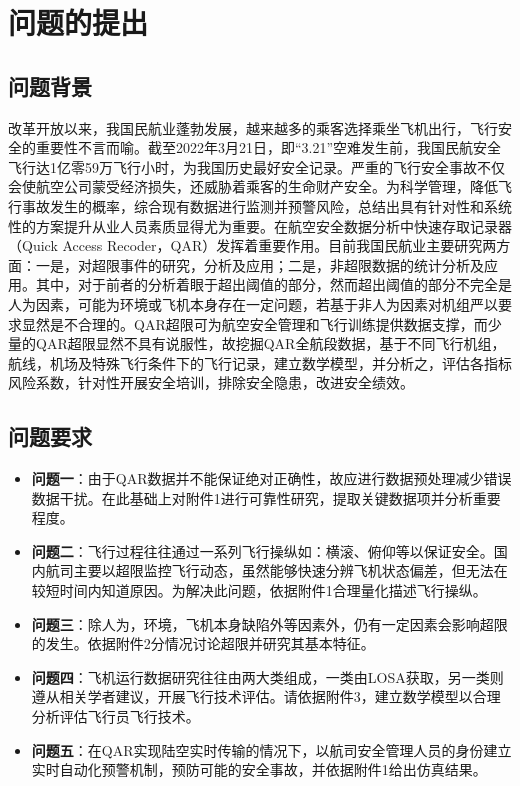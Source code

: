 \documentclass{MathorCupModeling}
\begin{document}
	\pagestyle{empty}
	\tableofcontents
	\newpage
	\pagestyle{fancy}

	\setcounter{page}{1}
	\section{问题的提出}
	\subsection{问题背景}
	改革开放以来，我国民航业蓬勃发展，越来越多的乘客选择乘坐飞机出行，飞行安全的重要性不言而喻。截至2022年3月21日，即“3.21”空难发生前，我国民航安全飞行达1亿零59万飞行小时，为我国历史最好安全记录。严重的飞行安全事故不仅会使航空公司蒙受经济损失，还威胁着乘客的生命财产安全。为科学管理，降低飞行事故发生的概率，综合现有数据进行监测并预警风险，总结出具有针对性和系统性的方案提升从业人员素质显得尤为重要。在航空安全数据分析中快速存取记录器（Quick Access Recoder，QAR）发挥着重要作用。目前我国民航业主要研究两方面：{\heiti 一是}，对超限事件的研究，分析及应用；{\heiti 二是}，非超限数据的统计分析及应用。其中，对于前者的分析着眼于超出阈值的部分，然而超出阈值的部分不完全是人为因素，可能为环境或飞机本身存在一定问题，若基于非人为因素对机组严以要求显然是不合理的。QAR超限可为航空安全管理和飞行训练提供数据支撑，而少量的QAR超限显然不具有说服性，故挖掘QAR全航段数据，基于不同飞行机组，航线，机场及特殊飞行条件下的飞行记录，建立数学模型，并分析之，评估各指标风险系数，针对性开展安全培训，排除安全隐患，改进安全绩效。
	\subsection{问题要求}
	\begin{itemize}
		\item \textbf{问题一}：由于QAR数据并不能保证绝对正确性，故应进行数据预处理减少错误数据干扰。在此基础上对附件1进行可靠性研究，提取关键数据项并分析重要程度。
		\item \textbf{问题二}：飞行过程往往通过一系列飞行操纵如：横滚、俯仰等以保证安全。国内航司主要以超限监控飞行动态，虽然能够快速分辨飞机状态偏差，但无法在较短时间内知道原因。为解决此问题，依据附件1合理量化描述飞行操纵。
		\item \textbf{问题三}：除人为，环境，飞机本身缺陷外等因素外，仍有一定因素会影响超限的发生。依据附件2分情况讨论超限并研究其基本特征。
		\item \textbf{问题四}：飞机运行数据研究往往由两大类组成，一类由LOSA获取，另一类则遵从相关学者建议，开展飞行技术评估。请依据附件3，建立数学模型以合理分析评估飞行员飞行技术。
		\item \textbf{问题五}：在QAR实现陆空实时传输的情况下，以航司安全管理人员的身份建立实时自动化预警机制，预防可能的安全事故，并依据附件1给出仿真结果。
	\end{itemize}
\end{document}
